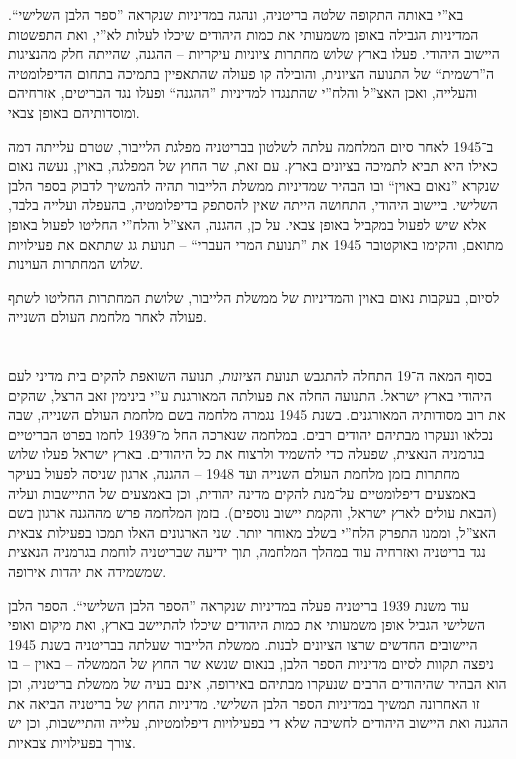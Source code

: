 \documentclass[]{../../../../tex/classes/homework}
\begin{document}
	בא''י באותה התקופה שלטה בריטניה, ונהגה במדיניות שנקראה ''ספר הלבן השלישי``. המדיניות הגבילה באופן משמעותי את כמות היהודים שיכלו לעלות לא''י, ואת התפשטות היישוב היהודי. פעלו בארץ שלוש מחתרות ציוניות עיקריות – ההגנה, שהייתה חלק מהנציגות ה''רשמית`` של התנועה הציונית, והובילה קו פעולה שהתאפיין בתמיכה בתחום הדיפלומטיה והעלייה, ואכן האצ''ל והלח''י שהתנגדו למדיניות ''ההגנה`` ופעלו נגד הבריטים, אזרחיהם ומוסדותיהם באופן צבאי. 
	
	ב־1945 לאחר סיום המלחמה עלתה לשלטון בבריטניה מפלגת הלייבור, שטרם עלייתה דמה כאילו היא תביא לתמיכה בציונים בארץ. עם זאת, שר החוץ של המפלגה, באוין, נעשה נאום שנקרא ''נאום באוין`` ובו הבהיר שמדיניות ממשלת הלייבור תהיה להמשיך לדבוק בספר הלבן השלישי. ביישוב היהודי, התחושה הייתה שאין להסתפק בדיפלומטיה, בהעפלה ועלייה בלבד, אלא שיש לפעול במקביל באופן צבאי. על כן, ההגנה, האצ''ל והלח''י החליטו לפעול באופן מתואם, והקימו באוקטובר 1945 את ''תנועת המרי העברי`` – תנועת גג שתתאם את פעילויות שלוש המחתרות העוינות. 
	
	לסיום, בעקבות נאום באוין והמדיניות של ממשלת הלייבור, שלושת המחתרות החליטו לשתף פעולה לאחר מלחמת העולם השנייה. 
	
	\section{}
	בסוף המאה ה־19 התחלה להתגבש תנועת ה\textit{ציונות}, תנועה השואפת להקים בית מדיני לעם היהודי בארץ ישראל. התנועה החלה את פעולתה המאורגנת ע''י בינימין זאב הרצל, שהקים את רוב מסודותיה המאורגנים. בשנת 1945 נגמרה מלחמה בשם מלחמת העולם השנייה, שבה נכלאו ונעקרו מבתיהם יהודים רבים. במלחמה שנארכה החל מ־1939 לחמו בפרט הבריטיים בגרמניה הנאצית, שפעלה כדי להשמיד ולרצוח את כל היהודים. בארץ ישראל פעלו שלוש מחתרות בזמן מלחמת העולם השנייה ועד 1948 – ההגנה, ארגון שניסה לפעול בעיקר באמצעים דיפלומטיים על־מנת להקים מדינה יהודית, וכן באמצעים של התיישבות ועליה (הבאת עולים לארץ ישראל, והקמת יישוב נוספים). בזמן המלחמה פרש מההגנה ארגון בשם האצ''ל, וממנו התפרק הלח''י בשלב מאוחר יותר. שני הארגונים האלו תמכו בפעילות צבאית נגד בריטניה ואזרחיה עוד במהלך המלחמה, תוך ידיעה שבריטניה לוחמת בגרמניה הנאצית שמשמידה את יהדות אירופה. 
	
	עוד משנת 1939 בריטניה פעלה במדיניות שנקראה ''הספר הלבן השלישי``. הספר הלבן השלישי הגביל אופן משמעותי את כמות היהודים שיכלו להתיישב בארץ, ואת מיקום ואופי היישובים החדשים שרצו הציונים לבנות. ממשלת הלייבור שעלתה בבריטניה בשנת 1945 ניפצה תקוות לסיום מדיניות הספר הלבן, בנאום שנשא שר החוץ של הממשלה – באוין – בו הוא הבהיר שהיהודים הרבים שנעקרו מבתיהם באירופה, אינם בעיה של ממשלת בריטניה, וכן זו האחרונה תמשיך במדיניות הספר הלבן השלישי. מדיניות החוץ של בריטניה הביאה את ההגנה ואת היישוב היהודים לחשיבה שלא די בפעילויות דיפלומטיות, עלייה והתיישבות, וכן יש צורך בפעילויות צבאיות. 
	
\end{document}
